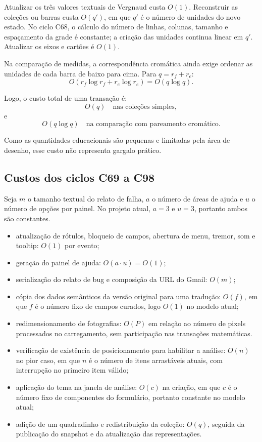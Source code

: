 \documentclass[12pt,a4paper]{article}
\begin{document}
Atualizar os três valores textuais de Vergnaud custa $O(1)$. Reconstruir as coleções ou barras custa $O(q')$, em que $q'$ é o número de unidades do novo estado. No ciclo C68, o cálculo do número de linhas, colunas, tamanho e espaçamento da grade é constante; a criação das unidades continua linear em $q'$. Atualizar os eixos e cartões é $O(1)$.

Na comparação de medidas, a correspondência cromática ainda exige ordenar as unidades de cada barra de baixo para cima. Para $q=r_f+r_e$:
\[
O(r_f\log r_f+r_e\log r_e)=O(q\log q).
\]

Logo, o custo total de uma transação é:
\[
O(q) \quad \text{nas coleções simples},
\]
e
\[
O(q\log q) \quad \text{na comparação com pareamento cromático}.
\]

Como as quantidades educacionais são pequenas e limitadas pela área de desenho, esse custo não representa gargalo prático.

\subsection{Custos dos ciclos C69 a C98}
Seja $m$ o tamanho textual do relato de falha, $a$ o número de áreas de ajuda e $u$ o número de opções por painel. No projeto atual, $a=3$ e $u=3$, portanto ambos são constantes.

\begin{itemize}[noitemsep]
  \item atualização de rótulos, bloqueio de campos, abertura de menu, tremor, som e tooltip: $O(1)$ por evento;
  \item geração do painel de ajuda: $O(a\cdot u)=O(1)$;
  \item serialização do relato de bug e composição da URL do Gmail: $O(m)$;
  \item cópia dos dados semânticos da versão original para uma tradução: $O(f)$, em que $f$ é o número fixo de campos curados, logo $O(1)$ no modelo atual;
  \item redimensionamento de fotografias: $O(P)$ em relação ao número de pixels processados no carregamento, sem participação nas transações matemáticas.
  \item verificação de existência de posicionamento para habilitar a análise: $O(n)$ no pior caso, em que $n$ é o número de itens arrastáveis atuais, com interrupção no primeiro item válido;
  \item aplicação do tema na janela de análise: $O(c)$ na criação, em que $c$ é o número fixo de componentes do formulário, portanto constante no modelo atual;
  \item adição de um quadradinho e redistribuição da coleção: $O(q)$, seguida da publicação do snapshot e da atualização das representações.
\end{itemize}
\end{document}
